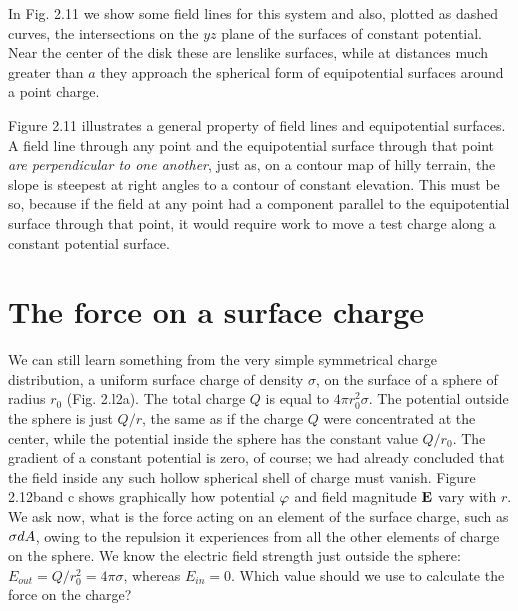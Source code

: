 In Fig. 2.11 we show some field lines for this system and also,
plotted as dashed curves, the intersections on the $yz$ plane of the surfaces
of constant potential. Near the center of the disk these are
lenslike surfaces, while at distances much greater than $a$ they 
approach the spherical form of equipotential surfaces around a point
charge.

Figure 2.11 illustrates a general property of field lines and 
equipotential surfaces. A field line through any point and the equipotential
surface through that point \emph{are perpendicular to one another}, just as,
on a contour map of hilly terrain, the slope is steepest at right angles
to a contour of constant elevation. This must be so, because if the
field at any point had a component parallel to the equipotential surface
through that point, it would require work to move a test charge
along a constant potential surface.




\section{The force on a surface charge}

We can still learn something from the very simple symmetrical
charge distribution, a uniform surface charge of density $\sigma$, on the
surface of a sphere of radius $r_0$ (Fig. 2.l2a). The total charge $Q$ is
equal to $4\pi r_0^2\sigma$. The potential outside the sphere is just $Q/r$, the
same as if the charge $Q$ were concentrated at the center, while the
potential inside the sphere has the constant value $Q/r_0$. The gradient
of a constant potential is zero, of course; we had already concluded
that the field inside any such hollow spherical shell of charge must
vanish. Figure 2.12band c shows graphically how potential $\varphi$ and
field magnitude $\mathbf{E}$ vary with $r$. We ask now, what is the force acting
on an element of the surface charge, such as $\sigma d A$, owing to the repulsion
it experiences from all the other elements of charge on the
sphere. We know the electric field strength just outside the sphere:
$E_{out}=Q/r_0^2=4\pi\sigma$, whereas $E_{in}=0$. Which value should we use
to calculate the force on the charge?

